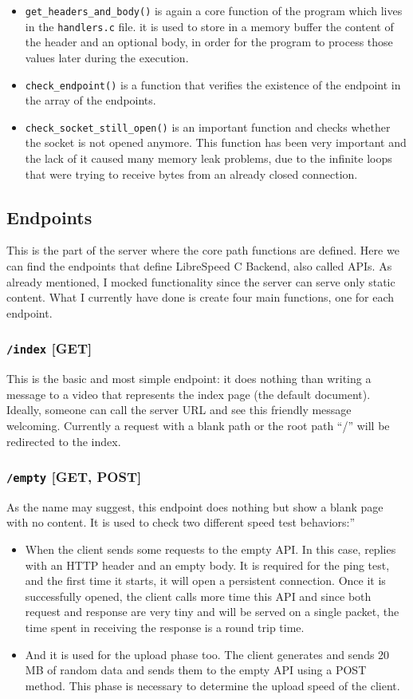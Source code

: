 \documentclass{article}
\begin{document}
\begin{itemize}
\item \texttt{get\_headers\_and\_body()} is again a core function of the program which lives in the \texttt{handlers.c} file. it is used to store in a memory buffer the content of the header and an optional body, in order for the program to process those values later during the execution.
\item \texttt{check\_endpoint()} is a function that verifies the existence of the endpoint in the array of the endpoints.
\item \texttt{check\_socket\_still\_open()} is an important function and checks whether the socket is not opened anymore. This function has been very important and the lack of it caused many memory leak problems, due to the infinite loops that were trying to receive bytes from an already closed connection.
\end{itemize}

\subsection{Endpoints}
This is the part of the server where the core path functions are defined. Here we can find the endpoints that define LibreSpeed C Backend, also called APIs. As already mentioned, I mocked functionality since the server can serve only static content.
What I currently have done is create four main functions, one for each endpoint.

\subsubsection{\texttt{/index} [GET]}
This is the basic and most simple endpoint: it does nothing than writing a message to a video that represents the index page (the default document). Ideally, someone can call the server URL and see this friendly message welcoming. Currently a request with a blank path or the root path “/” will be redirected to the index.

\subsubsection{\texttt{/empty} [GET, POST]}
As the name may suggest, this endpoint does nothing but show a blank page with no content. It is used to check two different speed test behaviors:”
\begin{itemize}
\item When the client sends some requests to the empty API. In this case, replies with an HTTP header and an empty body. It is required for the ping test, and the first time it starts, it will open a persistent connection. Once it is successfully opened, the client calls more time this API and since both request and response are very tiny and will be served on a single packet, the time spent in receiving the response is a round trip time.
\item And it is used for the upload phase too. The client generates and sends 20 MB of random data and sends them to the empty API using a POST method. This phase is necessary to determine the upload speed of the client.
\end{itemize}
\end{document}
